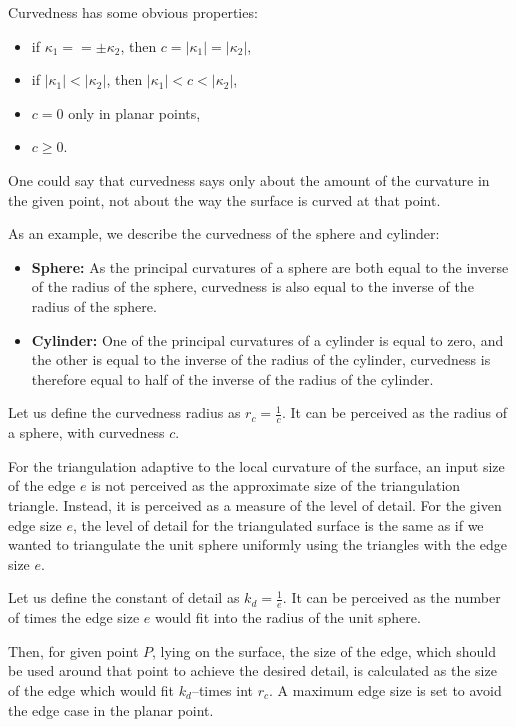Curvedness has some obvious properties:
\begin{itemize}
    \item if $\kappa_1 == \pm\kappa_2$, then $c=|\kappa_1|=|\kappa_2|$,
    \item if $|\kappa_1|<|\kappa_2|$, then $|\kappa_1|<c<|\kappa_2|$,
    \item $c=0$ only in planar points,
    \item $c\geq0$. 
\end{itemize}

One could say that curvedness says only about the amount of the curvature
in the given point, not about the way the surface is curved at that point.

As an example, we describe the curvedness of the sphere and cylinder:
\begin{itemize}
    \item \textbf{Sphere:} As the principal curvatures of a sphere are both 
    equal to the inverse of the radius of the sphere, curvedness is also equal 
    to the inverse of the radius of the sphere.
    \item \textbf{Cylinder:} One of the principal curvatures of a cylinder
    is equal to zero, and the other is equal to the inverse of the radius of 
    the cylinder, curvedness is therefore equal to half of the inverse of 
    the radius of the cylinder.
\end{itemize}
 
Let us define the curvedness radius as $r_c = \frac{1}{c}$. It can be perceived as
the radius of a sphere, with curvedness $c$.

For the triangulation adaptive to the local curvature of the surface, an input
size of the edge $e$ is not perceived as the approximate size of the triangulation
triangle. Instead, it is perceived as a measure of the level of detail.
For the given edge size $e$, the level of detail for the triangulated surface
is the same as if we wanted to triangulate the unit sphere uniformly using
the triangles with the edge size $e$.

Let us define the constant of detail as $k_d = \frac{1}{e}$. It can be perceived
as the number of times the edge size $e$ would fit into the radius of the unit
sphere.

Then, for given point $P$, lying on the surface, the size of the edge, which
should be used around that point to achieve the desired detail, is 
calculated as the size of the edge which would fit $k_d$--times int $r_c$.
A maximum edge size is set to avoid the edge case in the planar point.

